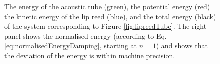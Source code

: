 \begin{figure}[h]
    \centering
      \caption{The energy of the acoustic tube (green), the potential energy (red) the kinetic energy of the lip reed (blue), and the total energy (black) of the system corresponding to Figure \ref{fig:lipreedTube}. The right panel shows the normalised energy (according to Eq. \eqref{eq:normalisedEnergyDamping}, starting at $n=1$) and shows that the deviation of the energy is within machine precision. \label{fig:lipReedEnergy}}
\end{figure}
